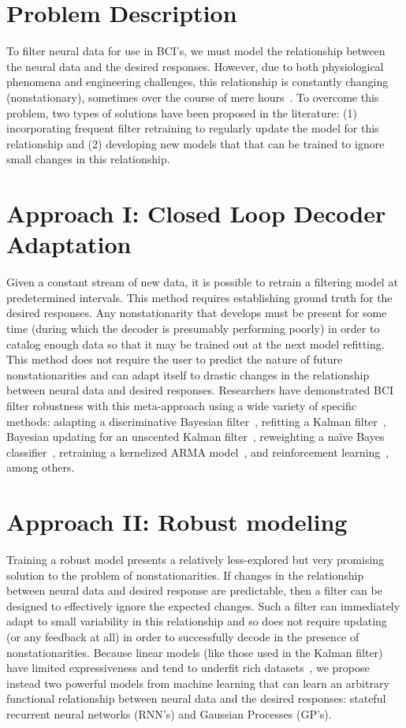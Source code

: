 
\section{Problem Description}
To filter neural data for use in BCI's, we must model the relationship between the neural data and the desired responses.  However, due to both physiological phenomena and engineering challenges, this relationship is constantly changing (nonstationary), sometimes over the course of mere hours~\cite{Per13,Per14}.  To overcome this problem, two types of solutions have been proposed in the literature: (1) incorporating frequent filter retraining to regularly update the model for this relationship and (2) developing new models that that can be trained to ignore small changes in this relationship.

\section{Approach I: Closed Loop Decoder Adaptation }
Given a constant stream of new data, it is possible to retrain a filtering model at predetermined intervals.  This method requires establishing ground truth for the desired responses.  Any nonstationarity that develops must be present for some time (during which the decoder is presumably performing poorly) in order to catalog enough data so that it may be trained out at the next model refitting.  This method does not require the user to predict the nature of future nonstationarities and can adapt itself to drastic changes in the relationship between neural data and desired responses.  Researchers have demonstrated BCI filter robustness with this meta-approach using a wide variety of specific methods: adapting a discriminative Bayesian filter~\cite{Bra17}, refitting a Kalman filter~\cite{Gil12, Dan13}, Bayesian updating for an unscented Kalman filter~\cite{Li11}, reweighting a na\"ive Bayes classifier~\cite{Bis14}, retraining a kernelized ARMA model~\cite{Shp09}, and reinforcement learning~\cite{Mah13,Poh14}, among others.

\section{Approach II: Robust modeling}
Training a robust model presents a relatively less-explored but very promising solution to the problem of nonstationarities.  If changes in the relationship between neural data and desired response are predictable, then  a filter can be designed to effectively ignore the expected changes.  Such a filter can immediately adapt to small variability in this relationship and so does not require updating (or any feedback at all) in order to successfully decode in the presence of nonstationarities.  Because linear models (like those used in the Kalman filter) have limited expressiveness and tend to underfit rich datasets~\cite{Sus16}, we propose instead two powerful models from machine learning that can learn an arbitrary functional relationship between neural data and the desired responses: stateful recurrent neural networks (RNN's) and Gaussian Processes (GP's).

